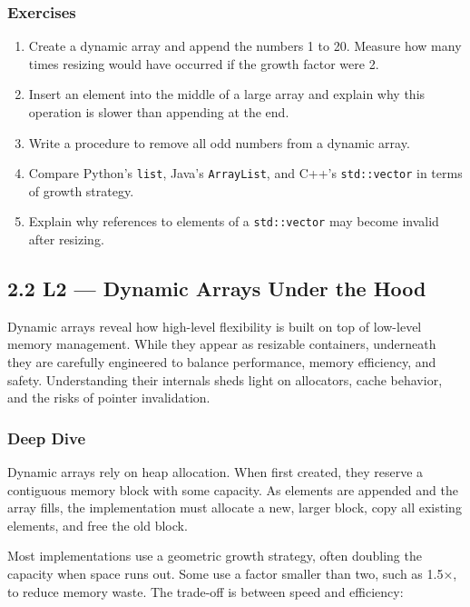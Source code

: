 \documentclass[
  letterpaper,
  DIV=11,
  numbers=noendperiod]{scrreprt}
\providecommand{\tightlist}{%
  \setlength{\itemsep}{0pt}\setlength{\parskip}{0pt}}
\begin{document}
\subsubsection{Exercises}\label{exercises-16}

\begin{enumerate}
\def\labelenumi{\arabic{enumi}.}
\tightlist
\item
  Create a dynamic array and append the numbers 1 to 20. Measure how
  many times resizing would have occurred if the growth factor were 2.
\item
  Insert an element into the middle of a large array and explain why
  this operation is slower than appending at the end.
\item
  Write a procedure to remove all odd numbers from a dynamic array.
\item
  Compare Python's \texttt{list}, Java's \texttt{ArrayList}, and C++'s
  \texttt{std::vector} in terms of growth strategy.
\item
  Explain why references to elements of a \texttt{std::vector} may
  become invalid after resizing.
\end{enumerate}

\subsection{2.2 L2 --- Dynamic Arrays Under the
Hood}\label{l2-dynamic-arrays-under-the-hood}

Dynamic arrays reveal how high-level flexibility is built on top of
low-level memory management. While they appear as resizable containers,
underneath they are carefully engineered to balance performance, memory
efficiency, and safety. Understanding their internals sheds light on
allocators, cache behavior, and the risks of pointer invalidation.

\subsubsection{Deep Dive}\label{deep-dive-8}

Dynamic arrays rely on heap allocation. When first created, they reserve
a contiguous memory block with some capacity. As elements are appended
and the array fills, the implementation must allocate a new, larger
block, copy all existing elements, and free the old block.

Most implementations use a geometric growth strategy, often doubling the
capacity when space runs out. Some use a factor smaller than two, such
as 1.5×, to reduce memory waste. The trade-off is between speed and
efficiency:
\end{document}
